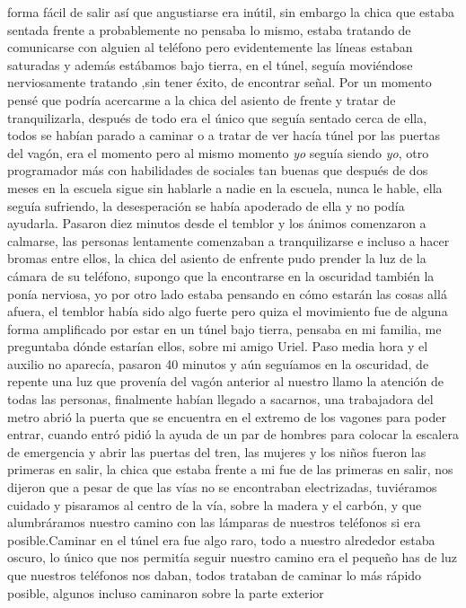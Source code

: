 \documentclass[letterpaper]{article}
\begin{document}
forma fácil de salir así que angustiarse era inútil, sin embargo la chica que estaba sentada frente
a probablemente no pensaba lo mismo, estaba tratando de comunicarse con alguien al teléfono pero
evidentemente las líneas estaban saturadas y además estábamos bajo tierra, en el túnel, seguía
moviéndose nerviosamente tratando ,sin tener éxito, de encontrar señal. Por un momento pensé que
podría acercarme a la chica del asiento de frente y tratar de tranquilizarla, después de todo era el
único que seguía sentado cerca de ella, todos se habían parado a caminar o a tratar de ver hacía
túnel por las puertas del vagón, era el momento pero al mismo momento \textit{yo} seguía siendo
\textit{yo}, otro programador más con habilidades de sociales tan buenas que después de dos meses en la escuela sigue
sin hablarle a nadie en la escuela, nunca le hable, ella seguía sufriendo, la desesperación se había
apoderado de ella y no podía ayudarla. Pasaron diez minutos desde el temblor y los ánimos comenzaron
a calmarse, las personas lentamente comenzaban a tranquilizarse e incluso a hacer bromas entre
ellos, la chica del asiento de enfrente pudo prender la luz de la cámara de su teléfono, supongo que
la encontrarse en la oscuridad también la ponía nerviosa, yo por otro lado estaba pensando en cómo
estarán las cosas allá afuera, el temblor había sido algo fuerte pero quiza el movimiento fue de
alguna forma amplificado por estar en un túnel bajo tierra, pensaba en mi familia, me preguntaba
dónde estarían ellos, sobre mi amigo Uriel. Paso media hora y el auxilio no aparecía, pasaron 40
minutos y aún seguíamos en la oscuridad, de repente una luz que provenía del vagón anterior al
nuestro llamo la atención de todas las personas, finalmente habían llegado a sacarnos, una
trabajadora del metro abrió la puerta que se encuentra en el extremo de los vagones para poder
entrar, cuando entró pidió la ayuda de un par de hombres para colocar la escalera de emergencia y
abrir las puertas del tren, las mujeres y los niños fueron las primeras en salir, la chica que
estaba frente a mi fue de las primeras en salir, nos dijeron que a pesar de que las vías no se
encontraban electrizadas, tuviéramos cuidado y pisaramos al centro de la vía, sobre la madera y el
carbón, y que alumbráramos nuestro camino con las lámparas de nuestros teléfonos si era
posible.Caminar en el túnel era fue algo raro, todo a nuestro alrededor estaba oscuro, lo único que
nos permitía seguir nuestro camino era el pequeño has de luz que nuestros teléfonos nos daban,
todos trataban de caminar lo más rápido posible, algunos incluso caminaron sobre la parte exterior
\end{document}
